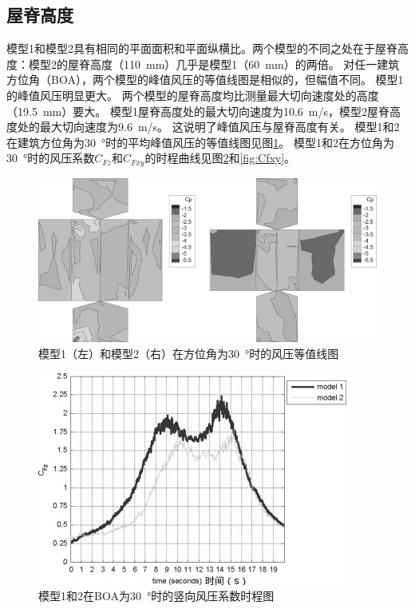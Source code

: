 \documentclass{ctexart}
\begin{document}
\subsection{屋脊高度}
模型1和模型2具有相同的平面面积和平面纵横比。两个模型的不同之处在于屋脊高度：模型2的屋脊高度（\SI{110}{mm}）几乎是模型1（\SI{60}{mm}）的两倍。
对任一建筑方位角（BOA），两个模型的峰值风压的等值线图是相似的，但幅值不同。
模型1的峰值风压明显更大。
两个模型的屋脊高度均比测量最大切向速度处的高度（\SI{19.5}{mm}）要大。
模型1屋脊高度处的最大切向速度为\SI{10.6}{m/s}，模型2屋脊高度处的最大切向速度为\SI{9.6}{m/s}。
这说明了峰值风压与屋脊高度有关。
模型1和2在建筑方位角为\SI{30}{\degree}时的平均峰值风压的等值线图见图\ref{fig:ppc}。
模型1和2在方位角为\SI{30}{\degree}时的风压系数$C_{Fz}$和$C_{Fxy}$的时程曲线见图\ref{fig:Cfz}和\ref{fig:Cfxy}。
\begin{figure}[h]
\centering
\includegraphics{./fig/4.jpg}
\caption{模型1（左）和模型2（右）在方位角为\SI{30}{\degree}时的风压等值线图}
\label{fig:ppc}
\end{figure}

\begin{figure}[h]
\centering
\includegraphics{./fig/5.jpg}
\caption{模型1和2在BOA为\SI{30}{\degree}时的竖向风压系数时程图}
\label{fig:Cfz}
\end{figure}
\end{document}

